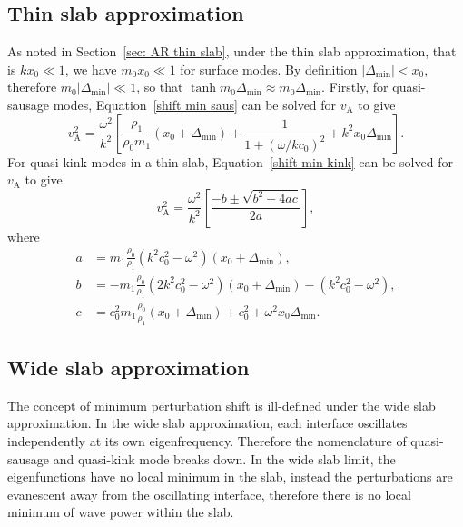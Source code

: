 \documentclass[namedreferences]{solarphysics}
\numberwithin{equation}{section}
\begin{document}
\begin{article}
\subsection{Thin slab approximation}
As noted in Section~\ref{sec: AR thin slab}, under the thin slab approximation, that is $kx_0 \ll 1$, we have $m_0x_0 \ll 1$ for surface modes. By definition $|\Delta_\textrm{min}| < x_0$, therefore $m_0|\Delta_\textrm{min}| \ll 1$, so that $\tanh{m_0\Delta_\textrm{min}} \approx m_0\Delta_\textrm{min}$. Firstly, for quasi-sausage modes, Equation~\eqref{shift min saus} can be solved for $v_\textrm{A}$ to give
\begin{equation}
v_\textrm{A}^2 = \frac{\omega^2}{k^2} \left[\frac{\rho_1}{\rho_0m_1}(x_0 + \Delta_\textrm{min}) + \frac{1}{1 + (\omega / kc_0)^2} + k^2x_0\Delta_\textrm{min}\right].
\end{equation}
For quasi-kink modes in a thin slab, Equation~\eqref{shift min kink} can be solved for $v_\textrm{A}$ to give
\begin{equation}
v_\textrm{A}^2 = \frac{\omega^2}{k^2}\left[\frac{-b \pm \sqrt{b^2 - 4ac}}{2a}\right],
\end{equation}
where
\begin{align}
a &= m_1\frac{\rho_0}{\rho_1}(k^2c_0^2 - \omega^2)(x_0 + \Delta_\textrm{min}), \\
b &= -m_1\frac{\rho_0}{\rho_1}(2k^2c_0^2 - \omega^2)(x_0 + \Delta_\textrm{min}) - (k^2c_0^2 - \omega^2), \\
c &= c_0^2m_1\frac{\rho_0}{\rho_1}(x_0 + \Delta_\textrm{min}) + c_0^2 + \omega^2x_0\Delta_\textrm{min}.
\end{align}


\subsection{Wide slab approximation}
The concept of minimum perturbation shift is ill-defined under the wide slab approximation. In the wide slab approximation, each interface oscillates independently at its own eigenfrequency. Therefore the nomenclature of quasi-sausage and quasi-kink mode breaks down. In the wide slab limit, the eigenfunctions have no local minimum in the slab, instead the perturbations are evanescent away from the oscillating interface, therefore there is no local minimum of wave power within the slab.



\end{article}
\end{document}
